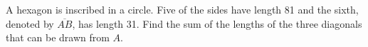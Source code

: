 A hexagon is inscribed in a circle. Five of the sides have length 81 and the sixth, denoted by $\overline{AB}$, has length 31. Find the sum of the lengths of the three diagonals that can be drawn from $A$.